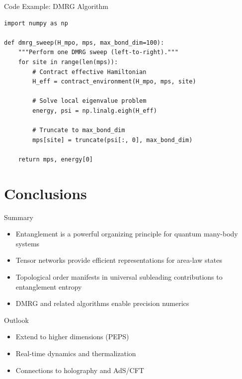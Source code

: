 \documentclass[aspectratio=169]{beamer}
\begin{document}
\begin{frame}[fragile]{Code Example: DMRG Algorithm}
  \begin{lstlisting}[caption={Single-site DMRG sweep}]
import numpy as np

def dmrg_sweep(H_mpo, mps, max_bond_dim=100):
    """Perform one DMRG sweep (left-to-right)."""
    for site in range(len(mps)):
        # Contract effective Hamiltonian
        H_eff = contract_environment(H_mpo, mps, site)

        # Solve local eigenvalue problem
        energy, psi = np.linalg.eigh(H_eff)

        # Truncate to max_bond_dim
        mps[site] = truncate(psi[:, 0], max_bond_dim)

    return mps, energy[0]
  \end{lstlisting}
\end{frame}

\section{Conclusions}

\begin{frame}{Summary}
  \begin{itemize}
    \item Entanglement is a powerful organizing principle for
          quantum many-body systems
    \item Tensor networks provide efficient representations
          for area-law states
    \item Topological order manifests in universal subleading
          contributions to entanglement entropy
    \item DMRG and related algorithms enable precision numerics
  \end{itemize}

  \vspace{1em}
  \begin{block}{Outlook}
    \begin{itemize}
      \item Extend to higher dimensions (PEPS)
      \item Real-time dynamics and thermalization
      \item Connections to holography and AdS/CFT
    \end{itemize}
  \end{block}
\end{frame}

\thankyoupage
\end{document}
